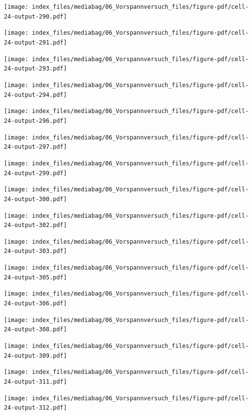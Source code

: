 \documentclass[
  11pt,
  letterpaper,
]{scrreprt}
\begin{document}
\newpage{}

\texttt{[image: index\_files/mediabag/06\_Vorspannversuch\_files/figure-pdf/cell-24-output-290.pdf]}

\texttt{[image: index\_files/mediabag/06\_Vorspannversuch\_files/figure-pdf/cell-24-output-291.pdf]}

\newpage{}

\texttt{[image: index\_files/mediabag/06\_Vorspannversuch\_files/figure-pdf/cell-24-output-293.pdf]}

\texttt{[image: index\_files/mediabag/06\_Vorspannversuch\_files/figure-pdf/cell-24-output-294.pdf]}

\newpage{}

\texttt{[image: index\_files/mediabag/06\_Vorspannversuch\_files/figure-pdf/cell-24-output-296.pdf]}

\texttt{[image: index\_files/mediabag/06\_Vorspannversuch\_files/figure-pdf/cell-24-output-297.pdf]}

\newpage{}

\texttt{[image: index\_files/mediabag/06\_Vorspannversuch\_files/figure-pdf/cell-24-output-299.pdf]}

\texttt{[image: index\_files/mediabag/06\_Vorspannversuch\_files/figure-pdf/cell-24-output-300.pdf]}

\newpage{}

\texttt{[image: index\_files/mediabag/06\_Vorspannversuch\_files/figure-pdf/cell-24-output-302.pdf]}

\texttt{[image: index\_files/mediabag/06\_Vorspannversuch\_files/figure-pdf/cell-24-output-303.pdf]}

\newpage{}

\texttt{[image: index\_files/mediabag/06\_Vorspannversuch\_files/figure-pdf/cell-24-output-305.pdf]}

\texttt{[image: index\_files/mediabag/06\_Vorspannversuch\_files/figure-pdf/cell-24-output-306.pdf]}

\newpage{}

\texttt{[image: index\_files/mediabag/06\_Vorspannversuch\_files/figure-pdf/cell-24-output-308.pdf]}

\texttt{[image: index\_files/mediabag/06\_Vorspannversuch\_files/figure-pdf/cell-24-output-309.pdf]}

\newpage{}

\texttt{[image: index\_files/mediabag/06\_Vorspannversuch\_files/figure-pdf/cell-24-output-311.pdf]}

\texttt{[image: index\_files/mediabag/06\_Vorspannversuch\_files/figure-pdf/cell-24-output-312.pdf]}
\end{document}
